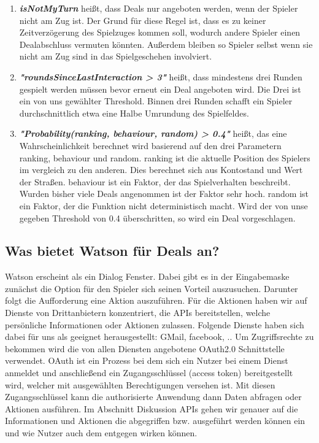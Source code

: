 \documentclass[german]{cgspaper} %
\newcommand{\neuerBegriff}[1]{\textbf{\textit{#1}}}
\begin{document}
\begin{enumerate}
  \item \neuerBegriff{isNotMyTurn} heißt, dass Deals nur angeboten werden, wenn der Spieler nicht am Zug ist. Der Grund für diese Regel ist, dass es zu keiner Zeitverzögerung des Spielzuges kommen soll, wodurch andere Spieler einen Dealabschluss vermuten könnten. Außerdem bleiben so Spieler selbst wenn sie nicht am Zug sind in das Spielgeschehen involviert.
  \item \neuerBegriff{"roundsSinceLastInteraction > 3"} heißt, dass mindestens drei Runden gespielt werden müssen bevor erneut ein Deal angeboten wird. Die Drei ist ein von uns gewählter Threshold. Binnen drei Runden schafft ein Spieler durchschnittlich etwa eine Halbe Umrundung des Spielfeldes.
  
    \item \neuerBegriff{"Probability(ranking, behaviour, random) > 0.4"} heißt, das eine Wahrscheinlichkeit berechnet wird basierend auf den drei Parametern ranking, behaviour und random.
ranking ist die aktuelle Position des Spielers im vergleich zu den anderen. Dies berechnet sich aus Kontostand und Wert der Straßen.
behaviour ist ein Faktor, der das Spielverhalten beschreibt. Wurden bisher viele Deals angenommen ist der Faktor sehr hoch.
random ist ein Faktor, der die Funktion nicht deterministisch macht. 
Wird der von unse gegeben Threshold von 0.4 überschritten, so wird ein Deal vorgeschlagen.
\end{enumerate}


\subsection{Was bietet Watson für Deals an?}

Watson erscheint als ein Dialog Fenster. Dabei gibt es in der Eingabemaske zunächst die Option für den Spieler sich seinen Vorteil auszusuchen. Darunter folgt die Aufforderung eine Aktion auszuführen. 
Für die Aktionen haben wir auf Dienste von Drittanbietern konzentriert, die APIs bereitstellen, welche persönliche Informationen oder Aktionen zulassen. Folgende Dienste haben sich dabei für uns als geeignet herausgestellt: GMail, facebook, ..
Um Zugriffsrechte zu bekommen wird die von allen Diensten angebotene OAuth2.0 Schnittstelle verwendet. OAuth ist ein Prozess bei dem sich ein Nutzer bei einem Dienst anmeldet und anschließend ein Zugangsschlüssel (access token) bereitgestellt wird, welcher mit ausgewählten Berechtigungen versehen ist. Mit diesen Zugangsschlüssel kann die authorisierte Anwendung dann Daten abfragen oder Aktionen ausführen.
Im Abschnitt Diskussion APIs gehen wir genauer auf die Informationen und Aktionen die abgegriffen bzw. ausgeführt werden können ein und wie Nutzer auch dem entgegen wirken können.
\end{document}
